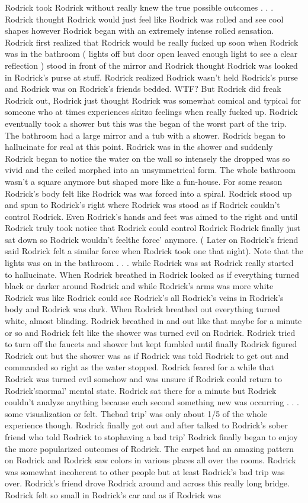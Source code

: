 \documentclass[12pt]{book}
\begin{document}
Rodrick took Rodrick without really knew the true possible outcomes . . .  Rodrick thought Rodrick would just feel like Rodrick was rolled and see cool shapes however Rodrick began with an extremely intense rolled sensation. Rodrick first realized that Rodrick would be really fucked up soon when Rodrick was in the bathroom ( lights off but door open leaved enough light to see a clear reflection ) stood in front of the mirror and Rodrick thought Rodrick was looked in Rodrick's purse at stuff. Rodrick realized Rodrick wasn't held Rodrick's purse and Rodrick was on Rodrick's friends bedded. WTF? But Rodrick did freak Rodrick out, Rodrick just thought Rodrick was somewhat comical and typical for someone who at times experiences skitzo feelings when really fucked up. Rodrick eventually took a shower but this was the began of the worst part of the trip. The bathroom had a large mirror and a tub with a shower. Rodrick began to hallucinate for real at this point. Rodrick was in the shower and suddenly Rodrick began to notice the water on the wall so intensely the dropped was so vivid and the ceiled morphed into an unsymmetrical form. The whole bathroom wasn't a square anymore but shaped more like a fun-house. For some reason Rodrick's body felt like Rodrick was was forced into a spiral. Rodrick stood up and spun to Rodrick's right where Rodrick was stood as if Rodrick couldn't control Rodrick. Even Rodrick's hands and feet was aimed to the right and until Rodrick truly took notice that Rodrick could control Rodrick Rodrick finally just sat down so Rodrick wouldn't feelthe force' anymore. ( Later on Rodrick's friend said Rodrick felt a similar force when Rodrick took one that night). Note that the lights was on in the bathroom . . .  while Rodrick was sat Rodrick really started to hallucinate. When Rodrick breathed in Rodrick looked as if everything turned black or darker around Rodrick and while Rodrick's arms was more white Rodrick was like Rodrick could see Rodrick's all Rodrick's veins in Rodrick's body and Rodrick was dark. When Rodrick breathed out everything turned white, almost blinding. Rodrick breathed in and out like that maybe for a minute or so and Rodrick felt like the shower was turned evil on Rodrick. Rodrick tried to turn off the faucets and shower but kept fumbled until finally Rodrick figured Rodrick out but the shower was as if Rodrick was told Rodrick to get out and commanded so right as the water stopped. Rodrick feared for a while that Rodrick was turned evil somehow and was unsure if Rodrick could return to Rodrick'snormal' mental state. Rodrick sat there for a minute but Rodrick couldn't analyze anything because each second something new was occurring . . .  some visualization or felt. Thebad trip' was only about 1/5 of the whole experience though. Rodrick finally got out and after talked to Rodrick's sober friend who told Rodrick to stophaving a bad trip' Rodrick finally began to enjoy the more popularized outcomes of Rodrick. The carpet had an amazing pattern on Rodrick and Rodrick saw colors in various places all over the rooms. Rodrick was somewhat incoherent to other people but at least Rodrick's bad trip was over. Rodrick's friend drove Rodrick around and across this really long bridge. Rodrick felt so small in Rodrick's car and as if Rodrick was 
\end{document}
